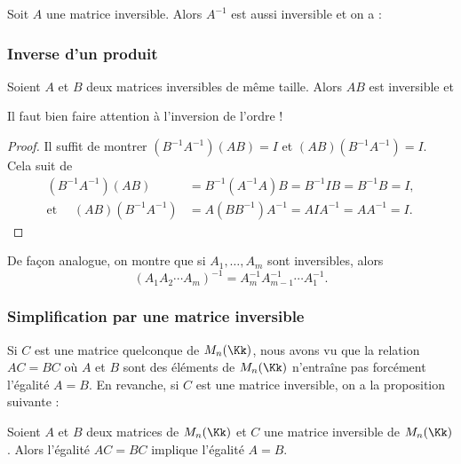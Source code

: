 \documentclass[class=report,crop=false]{standalone}
\begin{document}
\begin{proposition}
Soit $A$ une matrice inversible. Alors
$A^{-1}$ est aussi inversible et on a :
\end{proposition}


\subsubsection{Inverse d'un produit}


\begin{proposition}
 Soient $A$ et $B$ deux matrices inversibles de même taille. Alors
 $AB$ est inversible et
\end{proposition}

Il faut bien faire attention à l'inversion de l'ordre !

\begin{proof}
  Il suffit de montrer $(B^{-1}A^{-1}) (AB) = I$ et $(AB) (B^{-1} A^{-1}) = I$.
 Cela suit de
 \begin{align*}
   (B^{-1}A^{-1}) (AB) &= B^{-1}(A^{-1}A)B = B^{-1}IB=B^{-1}B=I,\\
   \text{et } \quad (AB)(B^{-1} A^{-1}) &= A(BB^{-1})A^{-1} = A I A^{-1} = A A^{-1} = I.
 \end{align*}
\end{proof}


De façon analogue, on montre que si $A_1, \dots , A_m$ sont inversibles, alors
\[(A_1 A_2 \cdots A_m)^{-1} = A_m^{-1} A_{m-1}^{-1} \cdots A^{-1}_1.\]



\subsubsection{Simplification par une matrice inversible}

Si $C$ est une matrice quelconque de $M_{n}(\Kk)$, nous avons vu
que  la relation  $AC=BC$
où $A$ et $B$ sont des éléments de  $M_{n}(\Kk)$
n'entraîne pas forcément l'égalité $A=B$.
En revanche, si $C$ est une matrice inversible, on a la proposition suivante :

\begin{proposition}
Soient $A$ et $B$ deux matrices de $M_{n}(\Kk)$ et $C$ une matrice
inversible de $M_{n}(\Kk)$.
Alors l'égalité $AC=BC$ implique l'égalité $A=B$.
\end{proposition}
\end{document}

